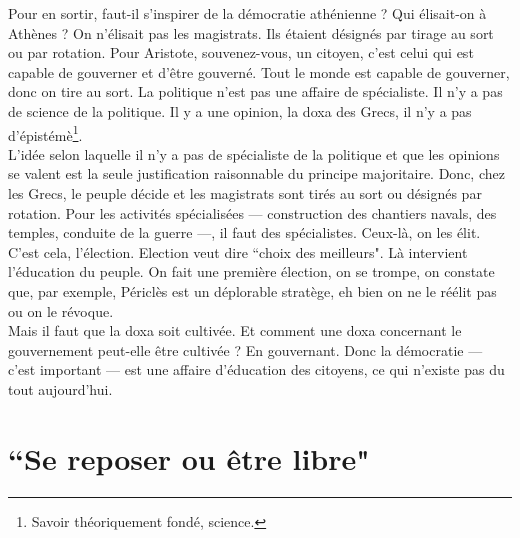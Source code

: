 Pour en sortir, faut-il s’inspirer de la démocratie athénienne ? Qui élisait-on à Athènes ? On n’élisait pas les magistrats. Ils étaient désignés par tirage au sort ou par rotation. Pour Aristote, souvenez-vous, un citoyen, c’est celui qui est capable de gouverner et d’être gouverné. Tout le monde est capable de gouverner, donc on tire au sort. La politique n’est pas une affaire de spécialiste. Il n’y a pas de science de la politique. Il y a une opinion, la doxa des Grecs, il n’y a pas d’épistémè\footnote{Savoir théoriquement fondé, science.}.\\
L’idée selon laquelle il n’y a pas de spécialiste de la politique et que les opinions se valent est la seule justification raisonnable du principe majoritaire. Donc, chez les Grecs, le peuple décide et les magistrats sont tirés au sort ou désignés par rotation. Pour les activités spécialisées --- construction des chantiers navals, des temples, conduite de la guerre ---, il faut des spécialistes. Ceux-là, on les élit. C’est cela, l’élection. Election veut dire ``choix des meilleurs". Là intervient l’éducation du peuple. On fait une première élection, on se trompe, on constate que, par exemple, Périclès est un déplorable stratège, eh bien on ne le réélit pas ou on le révoque.\\
Mais il faut que la doxa soit cultivée. Et comment une doxa concernant le gouvernement peut-elle être cultivée ? En gouvernant. Donc la démocratie --- c’est important --- est une affaire d’éducation des citoyens, ce qui n’existe pas du tout aujourd’hui.

\section*{``Se reposer ou être libre"}

